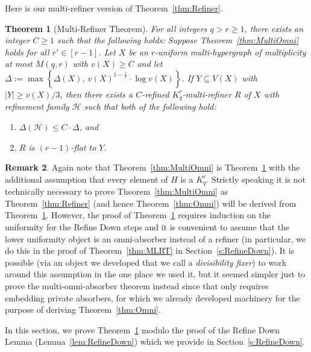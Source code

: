 \documentclass[11pt]{article}
\newcounter{i}
\theoremstyle{plain}
\newtheorem{thm}{Theorem}[section]
\theoremstyle{plain} %
\theoremstyle{definition}
\newtheorem{remark}[thm]{Remark}
\begin{document}
\noindent
Here is our multi-refiner version of Theorem~\ref{thm:Refiner}.

\begin{thm}[Multi-Refiner Theorem]\label{thm:MRT}
For all integers $q > r\ge 1$, there exists an integer $C \ge 1$ such that the following holds: Suppose Theorem~\ref{thm:MultiOmni} holds for all $r'\in [r-1]$. Let $X$ be an $r$-uniform multi-hypergraph of multiplicity at most $M(q,r)$ with $v(X)\ge C$ and let $\Delta:= \max\left\{\Delta(X),~v(X)^{1-\frac{1}{r}}\cdot \log v(X)\right\}$. If $Y\subseteq V(X)$ with $|Y| \ge v(X)/3$, then there exists a $C$-refined $K_q^r$-multi-refiner $R$ of $X$ with refinement family $\mathcal{H}$ such that both of the following hold:
\begin{enumerate}
    \item[(1)] $\Delta(\mathcal{H}) \le C \cdot \Delta$, and
    \item[(2)] $R$ is $(r-1)$-flat to $Y$. 
\end{enumerate}      
\end{thm}

\begin{remark}
Again note that Theorem~\ref{thm:MultiOmni} is Theorem~\ref{thm:MRT} with the additional assumption that every element of $H$ is a $K_q^r$. Strictly speaking it is not technically necessary to prove Theorem~\ref{thm:MultiOmni} as Theorem~\ref{thm:Refiner} (and hence Theorem~\ref{thm:Omni}) will be derived from Theorem~\ref{thm:MRT}. However, the proof of Theorem~\ref{thm:MRT} requires induction on the uniformity for the Refine Down steps and it is convenient to assume that the lower uniformity object is an omni-absorber instead of a refiner (in particular, we do this in the proof of Theorem~\ref{thm:MLRT} in Section~\ref{s:RefineDown}). It is possible (via an object we developed that we call a \emph{divisibility fixer}) to work around this assumption in the one place we used it, but it seemed simpler just to prove the multi-omni-absorber theorem instead since that only requires embedding private absorbers, for which we already developed machinery for the purpose of deriving Theorem~\ref{thm:Omni}.    
\end{remark}

In this section, we prove Theorem~\ref{thm:MRT} modulo the proof of the Refine Down Lemma (Lemma~\ref{lem:RefineDown}) which we provide in Section~\ref{s:RefineDown}. 
\end{document}
